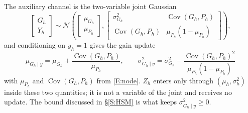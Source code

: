 \documentclass[letterpaper]{article}
\begin{document}
The auxiliary channel is the two-variable joint Gaussian
\begin{equation}
\begin{bmatrix}G_h\\ Y_h\end{bmatrix}\sim\mathcal N\!\left(\begin{bmatrix}\mu_{G_h}\\ \mu_{P_h}\end{bmatrix},
\begin{bmatrix}\sigma^2_{G_h}&\operatorname{Cov}(G_h,P_h)\\ \operatorname{Cov}(G_h,P_h)&\mu_{P_h}(1-\mu_{P_h})\end{bmatrix}\right),
\end{equation}
and conditioning on $y_h=1$ gives the gain update
\begin{equation}
\boxed{\;
\mu_{G_h\mid y}=\mu_{G_h}+\frac{\operatorname{Cov}(G_h,P_h)}{\mu_{P_h}},\qquad
\sigma^2_{G_h\mid y}=\sigma^2_{G_h}-\frac{\operatorname{Cov}(G_h,P_h)^2}{\mu_{P_h}(1-\mu_{P_h})}\;}
\label{E:update}
\end{equation}
with $\mu_{P_h}$ and $\operatorname{Cov}(G_h,P_h)$ from \eqref{E:node}. $Z_h$ enters only through $(\mu_h,\sigma_h^2)$ inside these two quantities; it is not a variable of the joint and receives no update. The bound discussed in \S\ref{S:HSM} is what keeps $\sigma^2_{G_h\mid y}\ge0$.
\end{document}

